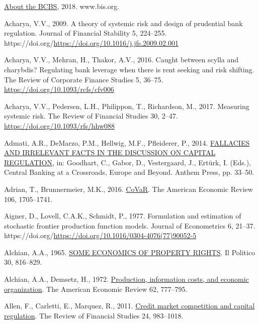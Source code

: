\documentclass[
  12pt,
  a4paper,
]{scrreprt}
\newlength{\cslhangindent}
\newenvironment{CSLReferences}[2] %
 {\begin{list}{}{%
  \setlength{\itemindent}{0pt}
  \setlength{\leftmargin}{0pt}
  \setlength{\parsep}{0pt}
  \ifodd #1
   \setlength{\leftmargin}{\cslhangindent}
   \setlength{\itemindent}{-1\cslhangindent}
  \fi
  \setlength{\itemsep}{#2\baselineskip}}}
 {\end{list}}
\begin{document}
\label{refs}
\begin{CSLReferences}{1}{0}
\href{https://www.bis.org/bcbs/about/overview.htm?m=85}{About the BCBS},
2018. www.bis.org.

Acharya, V.V., 2009. A theory of systemic risk and design of prudential
bank regulation. Journal of Financial Stability 5, 224--255.
https://doi.org/\url{https://doi.org/10.1016/j.jfs.2009.02.001}

Acharya, V.V., Mehran, H., Thakor, A.V., 2016. Caught between scylla and
charybdis? Regulating bank leverage when there is rent seeking and risk
shifting. The Review of Corporate Finance Studies 5, 36--75.
\url{https://doi.org/10.1093/rcfs/cfv006}

Acharya, V.V., Pedersen, L.H., Philippon, T., Richardson, M., 2017.
Measuring systemic risk. The Review of Financial Studies 30, 2--47.
\url{https://doi.org/10.1093/rfs/hhw088}

Admati, A.R., DeMarzo, P.M., Hellwig, M.F., Pfleiderer, P., 2014.
\href{http://www.jstor.org/stable/j.ctt1gxpd6m.6}{FALLACIES AND
IRRELEVANT FACTS IN THE DISCUSSION ON CAPITAL REGULATION}, in: Goodhart,
C., Gabor, D., Vestergaard, J., Ertürk, I. (Eds.), Central Banking at a
Crossroads, Europe and Beyond. Anthem Press, pp. 33--50.

Adrian, T., Brunnermeier, M.K., 2016.
\href{http://www.jstor.org/stable/43861110}{CoVaR}. The American
Economic Review 106, 1705--1741.

Aigner, D., Lovell, C.A.K., Schmidt, P., 1977. Formulation and
estimation of stochastic frontier production function models. Journal of
Econometrics 6, 21--37.
https://doi.org/\url{https://doi.org/10.1016/0304-4076(77)90052-5}

Alchian, A.A., 1965. \href{http://www.jstor.org/stable/43206327}{SOME
ECONOMICS OF PROPERTY RIGHTS}. Il Politico 30, 816--829.

Alchian, A.A., Demsetz, H., 1972.
\href{http://www.jstor.org/stable/1815199}{Production, information
costs, and economic organization}. The American Economic Review 62,
777--795.

Allen, F., Carletti, E., Marquez, R., 2011.
\href{http://www.jstor.org.queens.ezp1.qub.ac.uk/stable/20869263}{Credit
market competition and capital regulation}. The Review of Financial
Studies 24, 983--1018.


\end{CSLReferences}
\end{document}
